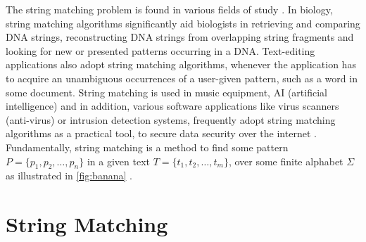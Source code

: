 \documentclass[12pt]{article} %
\begin{document}
The string matching problem is found in various fields of study \cite{mit}. In biology, string matching algorithms significantly aid biologists in retrieving and comparing DNA strings, reconstructing DNA strings from overlapping string fragments and looking for new or presented patterns occurring in a DNA\cite{gusfield}. Text-editing applications also adopt string matching algorithms, whenever the application has to acquire an unambiguous occurrences of a user-given pattern, such as a word in some document\cite{introduction, gusfield}. String matching is used in music equipment, AI (artificial intelligence) and in addition, various software applications like virus scanners (anti-virus) or intrusion detection systems, frequently adopt string matching algorithms as a practical tool, to secure data security over the internet \cite{detection}.
Fundamentally, string matching is a method to find some pattern $P =\{p_1,p_2,…,p_n\}$ in a given text $T=\{t_1, t_2,…,t_m\}$, over some finite alphabet $\Sigma$ as illustrated in \cref{fig:banana} \cite{detection}.

\section {String Matching}
\end{document}
